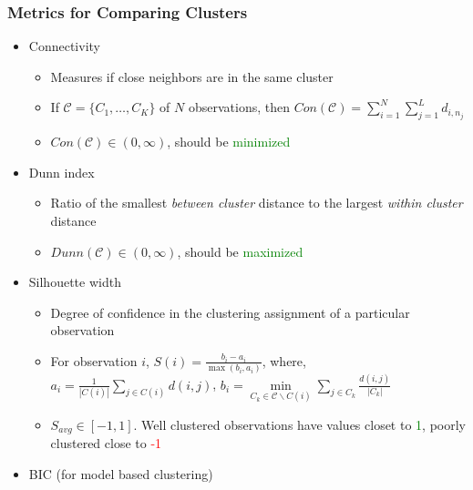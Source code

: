 \documentclass[10pt,dvipsnames,table, handout]{beamer} %
\begin{document}
\begin{frame}
\frametitle{Metrics for Comparing Clusters}
\begin{itemize}
\pause \item Connectivity
\begin{itemize}
\item Measures if close neighbors are in the same cluster
\item If $\mathcal{C} = \{C_1, \dots, C_K \}$ of $N$ observations, then $Con(\mathcal{C}) = \sum\limits_{i=1}^{N} \sum\limits_{j=1}^{L} d_{i, n_j}$
\item $Con(\mathcal{C}) \in (0, \infty)$, should be \textcolor{green}{minimized} 
\end{itemize}
\pause \item Dunn index
\begin{itemize}
\item Ratio of the smallest {\emph{between cluster}} distance to the largest {\emph{within cluster}} distance
\item $Dunn(\mathcal{C}) \in (0, \infty)$, should be \textcolor{green}{maximized} 
\end{itemize}
\pause \item Silhouette width
\begin{itemize}
\item Degree of confidence in the clustering assignment of a particular observation
\item For observation $i$, $S(i) = \frac{b_i - a_i}{\max(b_i,a_i)}$, where, $a_i = \frac{1}{|C(i)|}\sum\limits_{j \in C(i)}d(i,j)$, $b_i = \min \limits_{C_k \in \mathcal{C} \backslash C(i) }\sum\limits_{j \in C_k}\frac{d(i,j)}{|C_k|}$
\item $S_{avg} \in [-1, 1]$. Well clustered observations have values closet to \textcolor{green}{1}, poorly clustered close to \textcolor{red}{-1}
\end{itemize}
\pause \item BIC (for model based clustering)
\end{itemize}
\end{frame}
\end{document}
